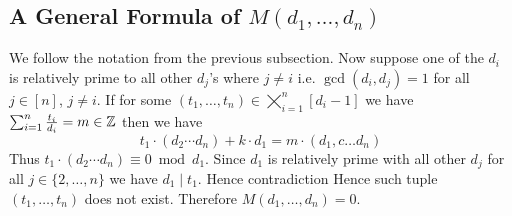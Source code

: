 \subsection{A General Formula of \texorpdfstring{$M(d_1,\dots, d_n)$}{M(d1,...,dn)}}
We follow the notation from the previous subsection. Now suppose one of the $d_i$ is relatively prime to all other $d_j$'s where $j\neq i$ i.e. $\gcd(d_i,d_j)=1$ for all $j\in[n]$, $j\neq i$. If for some $(t_1,\dots, t_n)\in\bigtimes_{i=1}^n[d_i-1]$ we have $\sum_{i=1}^n \frac{t_i}{d_i}=m\in\mathbb{Z}$ then we have $$t_1\cdot (d_2\cdots d_n)+k\cdot d_1=m\cdot (d_1,c\dots d_n)$$Thus $t_1\cdot (d_2\cdots d_n)\equiv 0\bmod{d_1}$. Since $d_1$ is relatively prime with all other $d_j$ for all $j\in\{2,\dots, n\}$ we have $d_1\mid t_1$. Hence contradiction \ctr Hence such tuple $(t_1,\dots,t_n)$ does not exist. Therefore $M(d_1,\dots, d_n)=0$. 


